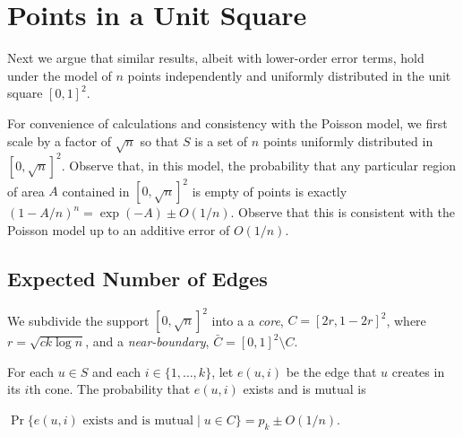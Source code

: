 \documentclass{patmorin}
\begin{document}
\section{Points in a Unit Square}

Next we argue that similar results, albeit with lower-order error terms,
hold under the model of $n$ points independently and uniformly distributed
in the unit square $[0,1]^2$.  

For convenience of calculations and consistency with the Poisson model,
we first scale by a factor of $\sqrt{n}$ so that $S$ is a set of $n$
points uniformly distributed in $[0,\sqrt{n}]^2$.  Observe that, in this
model, the probability that any particular region of area $A$ contained
in $[0,\sqrt{n}]^2$ is empty of points is exactly $(1-A/n)^n=\exp(-A)\pm
O(1/n)$.  Observe that this is consistent with the Poisson model up to 
an additive error of $O(1/n)$.

\subsection{Expected Number of Edges}

We subdivide the support $[0,\sqrt{n}]^2$ into a a \emph{core},
$C=[2r,1-2r]^2$, where $r=\sqrt{ck\log n}$, and a \emph{near-boundary},
$\bar{C}=[0,1]^2\setminus C$.

For each $u\in S$ and each $i\in\{1,\ldots,k\}$, let $e(u,i)$ be the
edge that $u$ creates in its $i$th cone.  The probability that $e(u,i)$
exists and is mutual is

\begin{lem}
  $\Pr\{\mbox{$e(u,i)$ exists and is mutual}\mid u\in C\} = p_k \pm O(1/n)$.
\end{lem}
\end{document}
